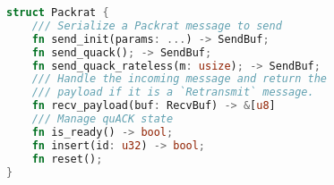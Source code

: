 \begin{lstfloat}[t]
\begin{lstlisting}[language=Rust]
struct Packrat {
    /// Serialize a Packrat message to send
    fn send_init(params: ...) -> SendBuf;
    fn send_quack(); -> SendBuf;
    fn send_quack_rateless(m: usize); -> SendBuf;
    /// Handle the incoming message and return the
    /// payload if it is a `Retransmit` message.
    fn recv_payload(buf: RecvBuf) -> &[u8]
    /// Manage quACK state
    fn is_ready() -> bool;
    fn insert(id: u32) -> bool;
    fn reset();
}
\end{lstlisting}
\label{lst:packrat:quacker-interface}
\end{lstfloat}